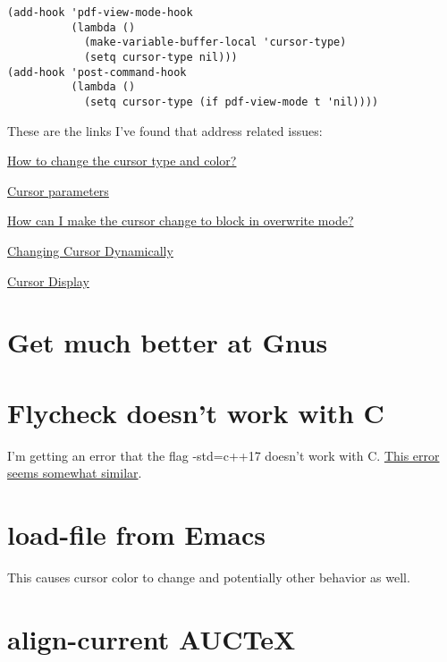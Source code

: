 \documentclass{default}
\begin{document}
\begin{verbatim}
(add-hook 'pdf-view-mode-hook
          (lambda ()
            (make-variable-buffer-local 'cursor-type)
            (setq cursor-type nil)))
(add-hook 'post-command-hook
          (lambda ()
            (setq cursor-type (if pdf-view-mode t 'nil))))
\end{verbatim}

These are the links I've found that address related issues:

\href{https://emacs.stackexchange.com/questions/392/how-to-change-the-cursor-type-and-color}{How to
  change the cursor type and color?}

\href{https://www.gnu.org/software/emacs/manual/html_node/elisp/Cursor-Parameters.html}{Cursor
  parameters}

\href{https://emacs.stackexchange.com/questions/44650/how-can-i-make-the-cursor-change-to-block-in-overwrite-mode?rq=1}{How
  can I make the cursor change to block in overwrite mode?}

\href{https://www.emacswiki.org/emacs/ChangingCursorDynamically}{Changing Cursor Dynamically}

\href{https://www.gnu.org/software/emacs/manual/html_node/emacs/Cursor-Display.html}{Cursor Display}

\section{Get much better at Gnus}

\section{Flycheck doesn't work with C}

I'm getting an error that the flag -std=c++17 doesn't work with
C\@. \href{https://github.com/alexmurray/flycheck-clang-analyzer/issues/6}{This error seems somewhat
similar}.

\section{load-file from Emacs}

This causes cursor color to change and potentially other behavior as well.

\section{align-current AUCTeX}
\end{document}
